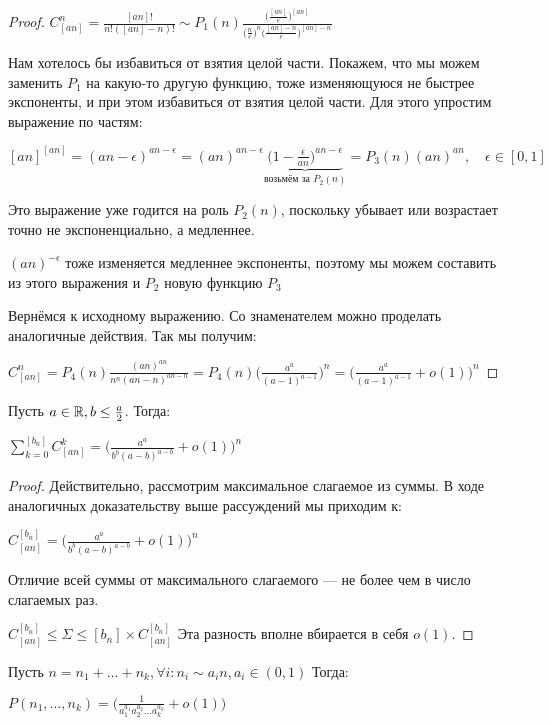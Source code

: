 \begin{proof}
$C^n_{[an]} = \frac {[an]!} {n!([an]-n)!} \sim P_1(n) \frac {\displaystyle \bigg ( \frac {[an]} e \bigg ) ^ {[an]}} {\displaystyle\bigg( \frac n e \bigg) ^n \bigg ( \frac {[an]-n} e \bigg ) ^ {[an]-n}}  $

Нам хотелось бы избавиться от взятия целой части. Покажем, что мы можем заменить $P_1$ на какую-то другую функцию, тоже изменяющуюся не быстрее экспоненты, и при этом избавиться от взятия целой части. Для этого упростим выражение по частям:

$[an]^{[an]} = (an - \epsilon)^{an-\epsilon}  = (an)^{an-\epsilon} \underbrace {\bigg(1- \frac \epsilon {an} \bigg) ^ {an - \epsilon} }
_{\text{возьмём за } P_2(n)} = P_3(n) (an)^{an}, \quad \epsilon \in [0,1] $

Это выражение уже годится на роль $P_2(n)$, поскольку убывает или возрастает точно не экспоненциально, а медленнее. 

$(an)^{-\epsilon} $ тоже изменяется медленнее экспоненты, поэтому мы можем составить из этого выражения и $P_2 $ новую функцию $P_3$

Вернёмся к исходному выражению. Со знаменателем можно проделать аналогичные действия. Так мы получим:

$C^n_{[an]} = P_4(n) \frac {(an)^{an}} { n^n (an - n)^{an-n}} = P_4(n) \bigg ( \frac {a^a} {(a-1)^{a-1}} \bigg ) ^n = \bigg( \frac {a^a} {(a-1)^{a-1}} + o(1) \bigg )^n$
\end{proof}

\begin{cor}
Пусть $a \in \mathbb{R}, b \leq \frac a 2$. Тогда:

$\sum \limits _{k=0} ^{[b_n]} C^k_{[an]} = \bigg( \frac  {a^a} {b^b(a-b)^{a-b}} + o(1)\bigg ) ^n $
\end{cor}
\begin{proof}
Действительно, рассмотрим максимальное слагаемое из суммы. В ходе аналогичных доказательству выше рассуждений мы приходим к:

$ C^{[b_n]}_{[an]} = \bigg( \frac  {a^a} {b^b(a-b)^{a-b}} + o(1)\bigg )^n $

Отличие всей суммы от максимального слагаемого --- не более чем в число слагаемых раз. 

$C^{[b_n]}_{[an]} \leq \Sigma \leq [b_n] \times  C^{[b_n]}_{[an]} $
Эта разность вполне вбирается в себя $o(1)$.
\end{proof}

\begin{thm}
Пусть $n = n_1 + \dots + n_k, \forall i: n_i \sim a_i n, a_i \in (0,1)$
Тогда:

$ P(n_1, \dots, n_k) = \bigg ( \frac 1 {a_1^ {a_1} a_2 ^ {a_2} \dots a_k^{a_k} } + o(1) \bigg) $
\end{thm}


